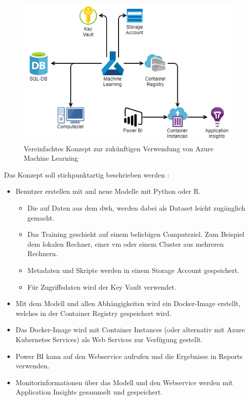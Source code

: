 \begin{figure}[htbp]
 \centering
 \includegraphics[width=\textwidth]{gfx/aml.png}
 \caption[Konzept: Azure Machine Learning]{Vereinfachtes Konzept zur zukünftigen Verwendung von Azure Machine Learning \cite[vgl.][]{msdoc_22_aml_arch}}
\label{fig:praktischeUmsetzung:ausblick:aml}
\end{figure}

Das Konzept soll stichpunktartig beschrieben werden \cite[vgl.][]{msdoc_22_aml_arch, soh_data_2020}:
\begin{itemize}
\item Benutzer erstellen mit \ac{aml} neue Modelle mit Python oder R.
\begin{itemize}
    \item Die auf Daten aus dem \ac{dwh}, werden dabei als Dataset leicht zugänglich gemacht.
    \item Das Training geschieht auf einem beliebigen Computeziel. Zum Beispiel dem lokalen Rechner, einer \ac{vm} oder einem Cluster aus mehreren Rechnern.
    \item Metadaten und Skripte werden in einem Storage Account gespeichert.
    \item Für Zugriffsdaten wird der Key Vault verwendet.
\end{itemize}
\item Mit dem Modell und allen Abhängigkeiten wird ein Docker-Image erstellt, welches in der Container Registry gespeichert wird.
\item Das Docker-Image wird mit Container Instances (oder alternativ mit Azure Kubernetes Services) als Web Services zur Verfügung gestellt.
\item Power BI kann auf den Webservice aufrufen und die Ergebnisse in Reports verwenden.
\item Monitorinformationen über das Modell und den Webservice werden mit Application Insights gesammelt und gespeichert.
\end{itemize}

